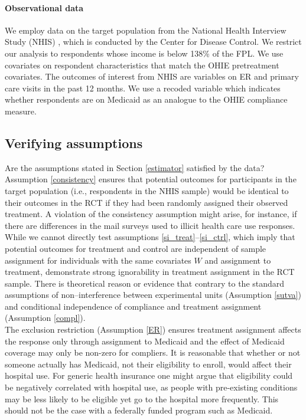 \documentclass[12pt]{article}
\newcommand{\todo}[1]{{\color{red}{TO DO: \sc #1}}}
\begin{document}
\paragraph{Observational data} 

We employ data on the target population from the National Health Interview Study (NHIS) \cite{NHIS}, which is conducted by the Center for Disease Control.  We restrict our analysis to respondents whose income is below 138\% of the FPL. We use covariates on respondent characteristics that match the OHIE pretreatment covariates. The outcomes of interest from NHIS are variables on ER  and primary care visits in the past 12 months. We use a recoded variable which indicates whether respondents are on Medicaid as an analogue to the OHIE compliance measure.

\subsection{Verifying assumptions}

\todo{Review statements in this subsection} 
Are the assumptions stated in Section \ref{estimator} satisfied by the data? Assumption \eqref{consistency} ensures that potential outcomes for participants in the target population (i.e., respondents in the NHIS sample) would be identical to their outcomes in the RCT if they had been randomly assigned their observed treatment. A violation of the consistency assumption might arise, for instance, if there are differences in the mail surveys used to illicit health care use responses. While we cannot directly test assumptions \eqref{si_treat}--\eqref{si_ctrl}, which imply that potential outcomes for treatment and control are independent of sample assignment for individuals with the same covariates $W$ and assignment to treatment, \citet{finkelstein2012} demonstrate strong ignorability in treatment assignment in the RCT sample. There is theoretical reason or evidence that contrary to the standard assumptions of non--interference between experimental units (Assumption \ref{sutva}) and conditional independence of compliance and treatment assignment (Assumption \ref{compl}). \\

The exclusion restriction (Assumption \ref{ER}) ensures treatment assignment affects the response only through assignment to Medicaid  and the effect of Medicaid coverage may only be non-zero for compliers. It is reasonable that whether or not someone actually has Medicaid, not their eligibility to enroll, would affect their hospital use.  For generic health insurance one might argue that eligibility could be negatively correlated with hospital use, as people with pre-existing conditions may be less likely to be eligible yet go to the hospital more frequently.  This should not be the case with a federally funded program such as Medicaid.
\end{document}
